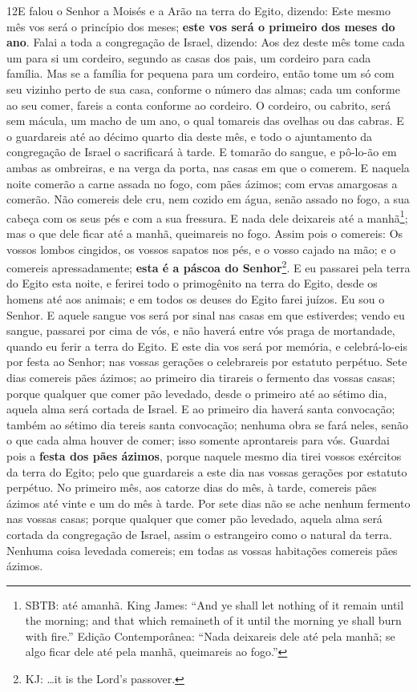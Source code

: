 \medskip

\lettrine{12} E falou o Senhor a Moisés e a Arão na terra do
Egito, dizendo: Este mesmo mês vos será o princípio dos meses;
\textbf{este vos será o primeiro dos meses do ano}. Falai a toda
a congregação de Israel, dizendo: Aos dez deste mês tome cada um
para si um cordeiro, segundo as casas dos pais, um cordeiro para
cada família. Mas se a família for pequena para um cordeiro,
então tome um só com seu vizinho perto de sua casa, conforme o
número das almas; cada um conforme ao seu comer, fareis a conta
conforme ao cordeiro. O cordeiro, ou cabrito, será sem mácula,
um macho de um ano, o qual tomareis das ovelhas ou das cabras. E
o guardareis até ao décimo quarto dia deste mês, e todo o
ajuntamento da congregação de Israel o sacrificará à tarde. E
tomarão do sangue, e pô-lo-ão em ambas as ombreiras, e na verga da
porta, nas casas em que o comerem. E naquela noite comerão a
carne assada no fogo, com pães ázimos; com ervas amargosas a
comerão. Não comereis dele cru, nem cozido em água, senão assado
no fogo, a sua cabeça com os seus pés e com a sua fressura. E
nada dele deixareis até a manhã\footnote{SBTB: até amanhã. King
James: ``And ye shall let nothing of it remain until the morning;
and that which remaineth of it until the morning ye shall burn with
fire.'' Edição Contemporânea: ``Nada deixareis dele até pela manhã;
se algo ficar dele até pela manhã, queimareis ao fogo.''}; mas o que
dele ficar até a manhã, queimareis no fogo. Assim pois o
comereis: Os vossos lombos cingidos, os vossos sapatos nos pés, e o
vosso cajado na mão; e o comereis apressadamente; \textbf{esta é a
páscoa do Senhor}\footnote{KJ: \ldots{}it is the Lord's passover.}.
E eu passarei pela terra do Egito esta noite, e ferirei todo
o primogênito na terra do Egito, desde os homens até aos animais; e
em todos os deuses do Egito farei juízos. Eu sou o Senhor. E
aquele sangue vos será por sinal nas casas em que estiverdes; vendo
eu sangue, passarei por cima de vós, e não haverá entre vós praga de
mortandade, quando eu ferir a terra do Egito. E este dia vos
será por memória, e celebrá-lo-eis por festa ao Senhor; nas vossas
gerações o celebrareis por estatuto perpétuo. Sete dias
comereis pães ázimos; ao primeiro dia tirareis o fermento das vossas
casas; porque qualquer que comer pão levedado, desde o primeiro até
ao sétimo dia, aquela alma será cortada de Israel. E ao
primeiro dia haverá santa convocação; também ao sétimo dia tereis
santa convocação; nenhuma obra se fará neles, senão o que cada alma
houver de comer; isso somente aprontareis para vós. Guardai
pois a \textbf{festa dos pães ázimos}, porque naquele mesmo dia
tirei vossos exércitos da terra do Egito; pelo que guardareis a este
dia nas vossas gerações por estatuto perpétuo. No primeiro
mês, aos catorze dias do mês, à tarde, comereis pães ázimos até
vinte e um do mês à tarde. Por sete dias não se ache nenhum
fermento nas vossas casas; porque qualquer que comer pão levedado,
aquela alma será cortada da congregação de Israel, assim o
estrangeiro como o natural da terra. Nenhuma coisa levedada
comereis; em todas as vossas habitações comereis pães ázimos.

